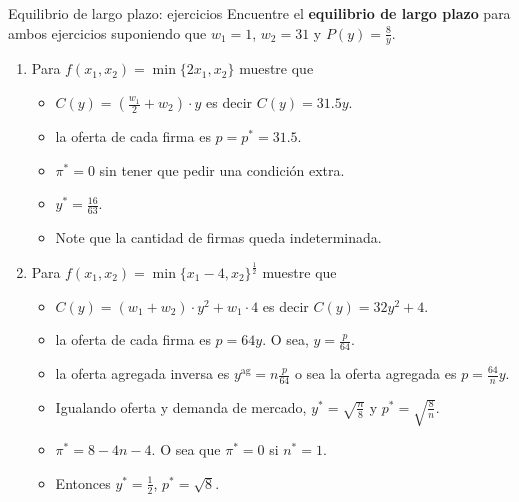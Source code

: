 \documentclass{beamer}
\theoremstyle{definition}
\begin{document}
\begin{frame}{Equilibrio de largo plazo: ejercicios}
\small
Encuentre el \textbf{equilibrio de largo plazo} para ambos ejercicios suponiendo que $w_1=1$, $w_2=31$ y $P(y)=\frac{8}{y}$.

\begin{enumerate}
    \item Para $f(x_1,x_2)=\min\{2x_1,x_2\}$ muestre que
    \begin{itemize} \color{gray}
        \item $C(y)=\left(\frac{w_1}{2}+w_2\right)\cdot y$ es decir $C(y)=31.5y$.
        \item la oferta de cada firma es $p=p^*=31.5$.  
        \item $\pi^*=0$ sin tener que pedir una condición extra.
        \item $y^*=\frac{16}{63}$.
        \item Note que la cantidad de firmas queda indeterminada.
    \end{itemize}
    \item Para $f(x_1,x_2)=\min\{x_1-4,x_2\}^{\frac{1}{2}}$ muestre que
    \begin{itemize} \color{gray}
        \item $C(y)=\left(w_1+w_2\right)\cdot y^2+w_1\cdot 4$ es decir $C(y)=32y^2+4$.
        \item la oferta de cada firma es $p=64y$. O sea, $y=\frac{p}{64}$.
        \item la oferta agregada inversa es $y^{\text{ag}}=n\frac{p}{64}$ o sea la oferta agregada es $p=\frac{64}{n}y$. 
        \item Igualando oferta y demanda de mercado, $y^*=\sqrt{\frac{n}{8}}$ y $p^*=\sqrt{\frac{8}{n}}$.
        \item $\pi^*=8-4n-4$. O sea que $\pi^*=0$ si $n^*=1$.
        \item Entonces $y^*=\frac{1}{2}$, $p^*=\sqrt{8}$.
    \end{itemize}
\end{enumerate}
\end{frame}
\end{document}
